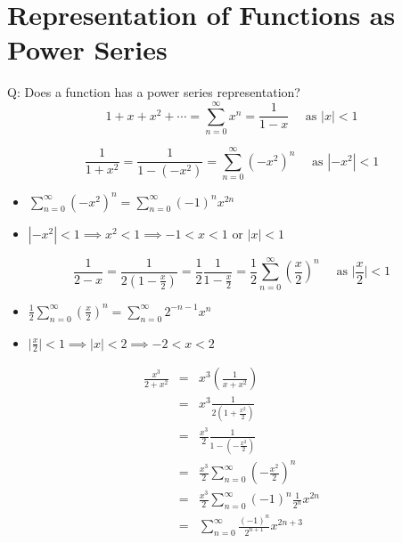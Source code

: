 \section{Representation of Functions as Power Series}
Q: Does a function has a power series representation?
\[\displaystyle 1 + x + x^2 + \cdots = \sum^{\infty}_{n = 0} x^n = \frac{1}{1 - x} \quad \text{ as } |x| < 1\]
\begin{eg}
\[\displaystyle \frac{1}{1 + x^2} = \frac{1}{1 - (-x^2)} = \sum^{\infty}_{n = 0} (-x^2)^n \quad \text{ as } |-x^2| < 1\]
\begin{itemize}
\item \(\displaystyle \sum^{\infty}_{n = 0} (-x^2)^n = \sum^{\infty}_{n = 0} (-1)^n x^{2n}\)
\item \(\displaystyle |-x^2| < 1 \implies x^2 < 1 \implies -1 < x < 1 \text{ or } |x| < 1\)
\end{itemize}
\end{eg}
\begin{eg}
\[\displaystyle \frac{1}{2 - x} = \frac{1}{2(1 - \frac{x}{2})} = \frac{1}{2} \frac{1}{1 - \frac{x}{2}} = \frac{1}{2} \sum^{\infty}_{n = 0} (\frac{x}{2})^n \quad \text{ as } \Big| \frac{x}{2} \Big| < 1\]
\begin{itemize}
\item \(\displaystyle \frac{1}{2} \sum^{\infty}_{n = 0} (\frac{x}{2})^n = \sum^{\infty}_{n = 0} 2^{-n-1} x^n\)
\item \(\displaystyle \Big| \frac{x}{2} \Big| < 1 \implies |x| < 2 \implies -2 < x < 2\)
\end{itemize}
\end{eg}
\begin{eg}
\[\begin{array}{rcl}
\displaystyle \frac{x^3}{2 + x^2} & = & \displaystyle x^3 (\frac{1}{x + x^2})\\
& = & \displaystyle x^3 \frac{1}{2(1 + \frac{x^2}{2})}\\
& = & \displaystyle \frac{x^3}{2} \frac{1}{1 - (- \frac{x^2}{2})}\\
& = & \displaystyle \frac{x^3}{2} \sum^{\infty}_{n = 0} (- \frac{x^2}{2})^n\\
& = & \displaystyle \frac{x^3}{2} \sum^{\infty}_{n = 0} (-1)^n \frac{1}{2^n} x^{2n}\\
& = & \displaystyle \sum^{\infty}_{n = 0} \frac{(-1)^n}{2^{n + 1}} x^{2n + 3}
\end{array}\]
\end{eg}
